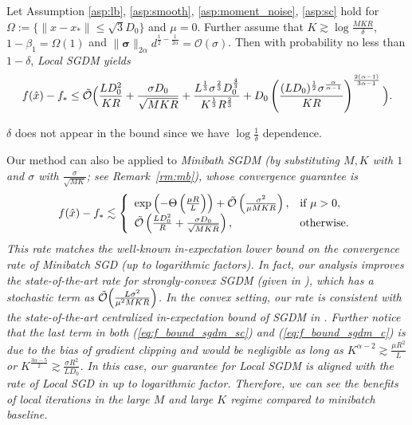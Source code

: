 \documentclass{article} %
\numberwithin{equation}{section}
\renewcommand{\eqref}[1]{(\ref{#1})}
\begin{document}
\begin{thm}\label{thm:sgdm_c}
    Let Assumption \ref{asp:lb}, \ref{asp:smooth},  \ref{asp:moment_noise}, \ref{asp:sc} hold for $\Omega:=\{\|x-x_*\|\leq \sqrt{3}D_0\}$ and $\mu=0$. Further assume that $K\gtrsim\log\frac{MKR}{\delta}$, $1-\beta_1=\Omega(1)$ and $\|\boldsymbol{\sigma}\|_{2\alpha}d^{\frac{1}{2}-\frac{1}{2\alpha}}=\mathcal{O}(\sigma)$.
    Then with probability no less than $1-\delta$, \em Local \em SGDM yields 
    \begin{equation}\label{eq:f_bound_sgdm_c}
        f(\hat{x})-f_* \leq
        \Tilde{\mathcal{O}}\Big(\frac{LD_0^2}{KR} + \frac{\sigma D_0}{\sqrt{MKR}} + \frac{L^{\frac{1}{3}}\sigma^{\frac{2}{3}}D_0^{\frac{4}{3}}}{K^{\frac{1}{3}}R^{\frac{2}{3}}} + D_0\left(\frac{(LD_0)^{\frac{1}{2}}\sigma^{\frac{\alpha}{\alpha-1}}}{KR}\right)^{\frac{2(\alpha-1)}{3\alpha-1}}\Big).
    \end{equation}
\end{thm}

\begin{rmk}
    $\delta$ does not appear in the bound since we have $\log\frac{1}{\delta}$ dependence.
\end{rmk}

Our method can also be applied to \em Minibath \em SGDM (by substituting $M,K$ with $1$ and $\sigma$ with $\frac{\sigma}{\sqrt{MK}}$; see Remark~\ref{rm:mb}), whose convergence guarantee is 
\begin{equation}\label{eq:f_bound_mb_sgdm}
    f(\hat{x})-f_* \lesssim
    \left\{
        \begin{array}{ll}
            \exp\left(-\Theta\left(\frac{\mu R}{L}\right)\right) + \Tilde{\mathcal{O}}\left(\frac{\sigma^2}{\mu MKR}\right), & \text{if } \mu>0, \\
            \Tilde{\mathcal{O}}\left(\frac{LD_0^2}{R} + \frac{\sigma D_0}{\sqrt{MKR}} \right), & \text{otherwise}.
        \end{array}
    \right.
\end{equation}
This rate matches the well-known in-expectation lower bound on the convergence rate of \em Minibatch \em SGD (up to logarithmic factors). In fact, our analysis improves the state-of-the-art rate for strongly-convex SGDM (given in \citet{liu2020improved}), which has a stochastic term as $\Tilde{\mathcal{O}}\Big(\frac{L\sigma^2}{\mu^2 MKR}\Big)$. In the convex setting, our rate is consistent with the state-of-the-art centralized in-expectation bound of SGDM in \citet{sebbouh2021almost}.
Further notice that the last term in both \eqref{eq:f_bound_sgdm_sc} and \eqref{eq:f_bound_sgdm_c} is due to the bias of gradient clipping and would be negligible as long as $K^{\alpha-2}\gtrsim \frac{\mu R^2}{L}$ or $K^{\frac{3\alpha-5}{2}}\gtrsim \frac{\sigma R^2}{LD_0}$.
In this case, our guarantee for \em Local \em SGDM is aligned with the rate of \em Local \em SGD in \citet{woodworth2020local, khaled2020tighter} up to logarithmic factor.
Therefore, we can see the benefits of local iterations in the large $M$ and large $K$ regime compared to minibatch baseline.
\end{document}

